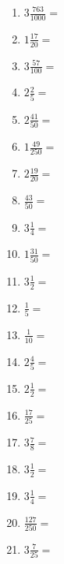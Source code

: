 \documentclass[12pt]{article}
\begin{document}
\begin{enumerate}
\item \large $ 3 \frac{763}{1000} = $ \vspace{1.5cm}
\item \large $ 1 \frac{17}{20} = $ \vspace{1.5cm}
\item \large $ 3 \frac{57}{100} = $ \vspace{1.5cm}
\item \large $ 2 \frac{2}{5} = $ \vspace{1.5cm}
\item \large $ 2 \frac{41}{50} = $ \vspace{1.5cm}
\item \large $ 1 \frac{49}{250} = $ \vspace{1.5cm}
\newpage
\item \large $ 2 \frac{19}{20} = $ \vspace{1.5cm}
\item \large $ \frac{43}{50} = $ \vspace{1.5cm}
\item \large $ 3 \frac{1}{4} = $ \vspace{1.5cm}
\item \large $ 1 \frac{31}{50} = $ \vspace{1.5cm}
\item \large $ 3 \frac{1}{2} = $ \vspace{1.5cm}
\item \large $ \frac{1}{5} = $ \vspace{1.5cm}
\item \large $ \frac{1}{10} = $ \vspace{1.5cm}
\item \large $ 2 \frac{4}{5} = $ \vspace{1.5cm}
\item \large $ 2 \frac{1}{2} = $ \vspace{1.5cm}
\item \large $ \frac{17}{25} = $ \vspace{1.5cm}
\newpage
\item \large $ 3 \frac{7}{8} = $ \vspace{1.5cm}
\item \large $ 3 \frac{1}{2} = $ \vspace{1.5cm}
\item \large $ 3 \frac{1}{4} = $ \vspace{1.5cm}
\item \large $ \frac{127}{250} = $ \vspace{1.5cm}
\item \large $ 3 \frac{7}{25} = $ \vspace{1.5cm}

\end{enumerate}
\end{document}
